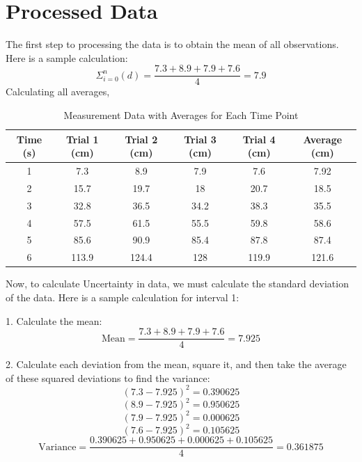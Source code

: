 \documentclass[12pt, letterpaper]{article}
\begin{document}
\section{Processed Data}
The first step to processing the data is to obtain the mean of all observations. Here is a sample calculation:
\[
\Sigma_{i=0}^n (d) =\frac{7.3+8.9+7.9+7.6}{4} = 7.9
\]
Calculating all averages,
\begin{table}[h!]
\centering
\begin{tabular}{|c|c|c|c|c|c|}
\hline
\textbf{Time (s)} & \textbf{Trial 1 (cm)} & \textbf{Trial 2 (cm)} & \textbf{Trial 3 (cm)} & \textbf{Trial 4 (cm)} & \textbf{Average (cm)} \\ \hline
1                 & 7.3                   & 8.9                   & 7.9                   & 7.6                   & 7.92                \\ \hline
2                 & 15.7                  & 19.7                  & 18                    & 20.7                  & 18.5                \\ \hline
3                 & 32.8                  & 36.5                  & 34.2                  & 38.3                  & 35.5                \\ \hline
4                 & 57.5                  & 61.5                  & 55.5                  & 59.8                  & 58.6                \\ \hline
5                 & 85.6                  & 90.9                  & 85.4                  & 87.8                  & 87.4                \\ \hline
6                 & 113.9                 & 124.4                 & 128                   & 119.9                 & 121.6                \\ \hline
\end{tabular}
\caption{Measurement Data with Averages for Each Time Point}
\label{table:measurement_data_averages}
\end{table}


Now, to calculate Uncertainty in data, we must calculate the standard deviation of the data. Here is a sample calculation for interval 1:

1. Calculate the mean:
   \[
   \text{Mean} = \frac{7.3 + 8.9 + 7.9 + 7.6}{4} = 7.925
   \]

2. Calculate each deviation from the mean, square it, and then take the average of these squared deviations to find the variance:
   \[
   (7.3 - 7.925)^2 = 0.390625
   \]
   \[
   (8.9 - 7.925)^2 = 0.950625
   \]
   \[
   (7.9 - 7.925)^2 = 0.000625
   \]
   \[
   (7.6 - 7.925)^2 = 0.105625
   \]
   \[
   \text{Variance} = \frac{0.390625 + 0.950625 + 0.000625 + 0.105625}{4} = 0.361875
   \]
\end{document}
